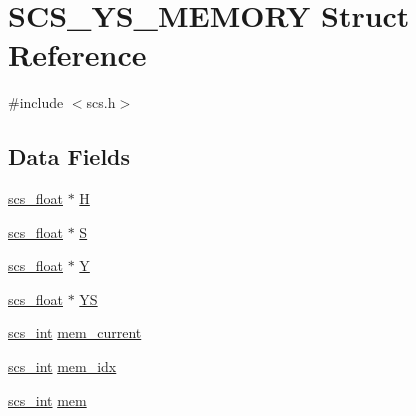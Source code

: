 \hypertarget{struct_s_c_s___y_s___m_e_m_o_r_y}{\section{S\-C\-S\-\_\-\-Y\-S\-\_\-\-M\-E\-M\-O\-R\-Y Struct Reference}
\label{struct_s_c_s___y_s___m_e_m_o_r_y}
}


{\ttfamily \#include $<$scs.\-h$>$}

\subsection*{Data Fields}
\begin{DoxyCompactItemize}
\item 
\hyperlink{glbopts_8h_ad37836e6404bb2c3ae8adcc6290699b9}{scs\-\_\-float} $\ast$ \hyperlink{struct_s_c_s___y_s___m_e_m_o_r_y_a20ecfd2b444b60c8fb86b34108f91c8d}{H}
\item 
\hyperlink{glbopts_8h_ad37836e6404bb2c3ae8adcc6290699b9}{scs\-\_\-float} $\ast$ \hyperlink{struct_s_c_s___y_s___m_e_m_o_r_y_a985ff0542e93c793746e489ec75478a8}{S}
\item 
\hyperlink{glbopts_8h_ad37836e6404bb2c3ae8adcc6290699b9}{scs\-\_\-float} $\ast$ \hyperlink{struct_s_c_s___y_s___m_e_m_o_r_y_a1f51e04778d5a79f30f57f9ff98014d6}{Y}
\item 
\hyperlink{glbopts_8h_ad37836e6404bb2c3ae8adcc6290699b9}{scs\-\_\-float} $\ast$ \hyperlink{struct_s_c_s___y_s___m_e_m_o_r_y_af1caeb11b2846ee6b77e7ae30e641ed3}{Y\-S}
\item 
\hyperlink{glbopts_8h_a23c48a83ce0c58783595ad45ffcaf76b}{scs\-\_\-int} \hyperlink{struct_s_c_s___y_s___m_e_m_o_r_y_a5f6c7f505b310ffa71afafbeb298e47a}{mem\-\_\-current}
\item 
\hyperlink{glbopts_8h_a23c48a83ce0c58783595ad45ffcaf76b}{scs\-\_\-int} \hyperlink{struct_s_c_s___y_s___m_e_m_o_r_y_a39a865c09daab9ab97d5dd8009e0a949}{mem\-\_\-idx}
\item 
\hyperlink{glbopts_8h_a23c48a83ce0c58783595ad45ffcaf76b}{scs\-\_\-int} \hyperlink{struct_s_c_s___y_s___m_e_m_o_r_y_a7220c04182b1c742d0f486b8cfb829f6}{mem}
\end{DoxyCompactItemize}


